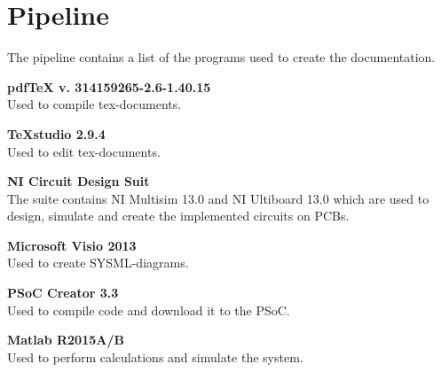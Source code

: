\newpage
\section{Pipeline}
The pipeline contains a list of the programs used to create the documentation.

\textbf{pdfTeX v. 314159265-2.6-1.40.15}\\
Used to compile tex-documents.

\textbf{TeXstudio 2.9.4}\\
Used to edit tex-documents.

\textbf{NI Circuit Design Suit}\\
The suite contains NI Multisim 13.0 and NI Ultiboard 13.0 which are used to design, simulate and create the implemented circuits on PCBs.

\textbf{Microsoft Visio 2013}\\
Used to create SYSML-diagrams.

\textbf{PSoC Creator 3.3}\\
Used to compile code and download it to the PSoC.

\textbf{Matlab R2015A/B}\\
Used to perform calculations and simulate the system.
